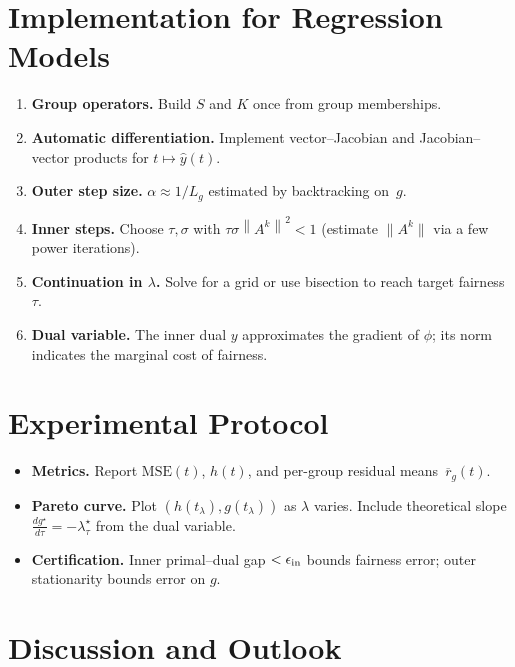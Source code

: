 \documentclass[11pt]{article}
\theoremstyle{plain}
\theoremstyle{definition}
\newcommand{\norm}[1]{\left\lVert #1 \right\rVert}
\newcommand{\1}{\mathbf{1}}
\begin{document}
\section{Implementation for Regression Models}

\begin{enumerate}[leftmargin=2em]
\item \textbf{Group operators.} Build $S$ and $K$ once from group memberships.
\item \textbf{Automatic differentiation.} Implement vector–Jacobian and Jacobian–vector products for $t\mapsto \hat y(t)$.
\item \textbf{Outer step size.} $\alpha\approx1/L_g$ estimated by backtracking on~$g$.
\item \textbf{Inner steps.} Choose $\tau,\sigma$ with $\tau\sigma\norm{A^k}^2<1$ (estimate $\|A^k\|$ via a few power iterations).
\item \textbf{Continuation in $\lambda$.} Solve for a grid or use bisection to reach target fairness~$\tau$.
\item \textbf{Dual variable.} The inner dual $y$ approximates the gradient of $\phi$; its norm indicates the marginal cost of fairness.
\end{enumerate}

\section{Experimental Protocol}

\begin{itemize}[leftmargin=2em]
\item \textbf{Metrics.} Report $\mathrm{MSE}(t)$, $h(t)$, and per-group residual means~$\overline{r}_g(t)$.
\item \textbf{Pareto curve.} Plot $(h(t_\lambda),g(t_\lambda))$ as $\lambda$ varies.
Include theoretical slope $\frac{dg^\star}{d\tau}=-\lambda^\star_\tau$ from the dual variable.
\item \textbf{Certification.} Inner primal–dual gap $<\epsilon_{\rm in}$ bounds fairness error; outer stationarity bounds error on $g$.
\end{itemize}

\section{Discussion and Outlook}
\end{document}
